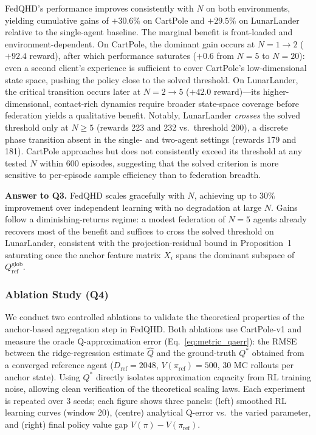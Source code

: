 FedQHD's performance improves consistently with $N$ on both environments, yielding cumulative gains of $+30.6\%$ on CartPole and $+29.5\%$ on LunarLander relative to the single-agent baseline.
The marginal benefit is front-loaded and environment-dependent.
On CartPole, the dominant gain occurs at $N\!=\!1{\to}2$ ($+92.4$ reward), after which performance saturates ($+0.6$ from $N\!=\!5$ to $N\!=\!20$): even a second client's experience is sufficient to cover CartPole's low-dimensional state space, pushing the policy close to the solved threshold.
On LunarLander, the critical transition occurs later at $N\!=\!2{\to}5$ ($+42.0$ reward)---its higher-dimensional, contact-rich dynamics require broader state-space coverage before federation yields a qualitative benefit.
Notably, LunarLander \emph{crosses} the solved threshold only at $N\!\geq\!5$ (rewards 223 and 232 vs.\ threshold 200), a discrete phase transition absent in the single- and two-agent settings (rewards 179 and 181).
CartPole approaches but does not consistently exceed its threshold at any tested $N$ within 600 episodes, suggesting that the solved criterion is more sensitive to per-episode sample efficiency than to federation breadth.

\textbf{Answer to Q3.} FedQHD scales gracefully with $N$, achieving up to $30\%$ improvement over independent learning with no degradation at large $N$.
Gains follow a diminishing-returns regime: a modest federation of $N\!=\!5$ agents already recovers most of the benefit and suffices to cross the solved threshold on LunarLander, consistent with the projection-residual bound in Proposition~1 saturating once the anchor feature matrix $X_i$ spans the dominant subspace of $Q^{\mathrm{glob}}_{\mathrm{ref}}$.



\subsubsection{Ablation Study (Q4)}
\label{subsec:ablation}

We conduct two controlled ablations to validate the theoretical properties of the anchor-based aggregation step in FedQHD.
Both ablations use CartPole-v1 and measure the oracle Q-approximation error (Eq.~\ref{eq:metric_qaerr}): the RMSE between the ridge-regression estimate $\hat{Q}$ and the ground-truth $Q^*$ obtained from a converged reference agent ($D_\mathrm{ref}=2048$, $V(\pi_\mathrm{ref})=500$, 30 MC rollouts per anchor state).
Using $Q^*$ directly isolates approximation capacity from RL training noise, allowing clean verification of the theoretical scaling laws.
Each experiment is repeated over 3 seeds; each figure shows three panels: (left) smoothed RL learning curves (window 20), (centre) analytical Q-error vs.\ the varied parameter, and (right) final policy value gap $V(\pi) - V(\pi_\mathrm{ref})$.

